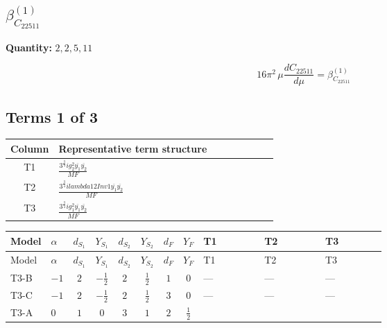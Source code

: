 \documentclass[8pt]{article}
\begin{document}
\begin{landscape}
\section*{$\beta_{C_{22511}}^{(1)}$}
\noindent\textbf{Quantity: }$\mathrm{2,2,5,11}$\par\smallskip
\[16\pi^2\,\mu\frac{d C_{22511}}{d\mu}=\beta_{C_{22511}}^{(1)}\]
\subsection*{Terms 1 of 3}
\begin{center}
\begin{tabular}{@{}c >{\raggedright\arraybackslash}p{0.82\linewidth}@{}}
\toprule
Column & Representative term structure \\
\midrule
T1 & \(\displaystyle \frac{3^{\frac{3}{4}} i g_{2}^{2} \overline{y_{1}} \overline{y_{2}}}{MF}\) \\
\midrule
T2 & \(\displaystyle \frac{3^{\frac{3}{4}} i lambda12Inv1 \overline{y_{1}} \overline{y_{2}}}{MF}\) \\
\midrule
T3 & \(\displaystyle \frac{3^{\frac{3}{4}} i g_{1}^{2} \overline{y_{1}} \overline{y_{2}}}{MF}\) \\
\midrule
\bottomrule
\end{tabular}
\end{center}
\smallskip
\tiny
\begin{longtable}{@{}llcccccc >{\raggedright\arraybackslash}p{0.21\linewidth} >{\raggedright\arraybackslash}p{0.21\linewidth} >{\raggedright\arraybackslash}p{0.21\linewidth}@{}}
\toprule
Model & $\alpha$ & $d_{S_1}$ & $Y_{S_1}$ & $d_{S_2}$ & $Y_{S_2}$ & $d_F$ & $Y_F$ & T1 & T2 & T3 \\
\midrule
\endfirsthead
\toprule
Model & $\alpha$ & $d_{S_1}$ & $Y_{S_1}$ & $d_{S_2}$ & $Y_{S_2}$ & $d_F$ & $Y_F$ & T1 & T2 & T3 \\
\midrule
\endhead
T3-B & $-1$ & $2$ & $-\frac{1}{2}$ & $2$ & $\frac{1}{2}$ & $1$ & $0$ & --- & --- & --- \\
\midrule
T3-C & $-1$ & $2$ & $-\frac{1}{2}$ & $2$ & $\frac{1}{2}$ & $3$ & $0$ & --- & --- & --- \\
\midrule
T3-A & $0$ & $1$ & $0$ & $3$ & $1$ & $2$ & $\frac{1}{2}$ & \scriptsize\adjustbox{max width=\linewidth}{$\begin{gathered} - \frac{11 \cdot 3^{\frac{3}{4}} i g_{2}^{2} \overline{y_{1}} \overline{y_{2}}}{8 MF}\end{gathered}$} & \scriptsize\adjustbox{max width=\linewidth}{$\begin{gathered} - \frac{3^{\frac{3}{4}} i lambda12Inv1 \overline{y_{1}} \overline{y_{2}}}{6 MF}\end{gathered}$} & \scriptsize\adjustbox{max width=\linewidth}{$\begin{gathered} - \frac{3^{\frac{3}{4}} i g_{1}^{2} \overline{y_{1}} \overline{y_{2}}}{8 MF}\end{gathered}$} \\

\end{longtable}
\end{landscape}
\end{document}
